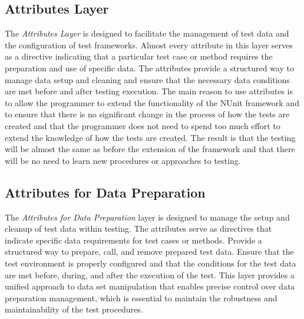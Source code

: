 \subsection{Attributes Layer}

The \textit{Attributes Layer} is designed to facilitate the management of test data and the configuration of test frameworks. Almost every attribute in this layer serves as a directive indicating that a particular test case or method requires the preparation and use of specific data. The attributes provide a structured way to manage data setup and cleaning and ensure that the necessary data conditions are met before and after testing execution. The main reason to use attributes is to allow the programmer to extend the functionality of the NUnit framework and to ensure that there is no significant change in the process of how the tests are created and that the programmer does not need to spend too much effort to extend the knowledge of how the tests are created. The result is that the testing will be almost the same as before the extension of the framework and that there will be no need to learn new procedures or approaches to testing.


\subsection*{Attributes for Data Preparation}

The \textit{Attributes for Data Preparation} layer is designed to manage the setup and cleanup of test data within testing. The attributes serve as directives that indicate specific data requirements for test cases or methods. Provide a structured way to prepare, call, and remove prepared test data.  Ensure that the test environment is properly configured and that the conditions for the test data are met before, during, and after the execution of the test. This layer provides a unified approach to data set manipulation that enables precise control over data preparation management, which is essential to maintain the robustness and maintainability of the test procedures.

